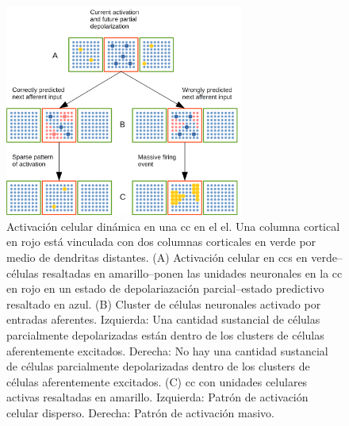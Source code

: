 \begin{figure}[h!]
    \centering
    \includegraphics[width=0.7\textwidth]{Activation.png}
    \caption{Activación celular dinámica en una \gls{cc} en el \gls{el}.
    Una columna cortical en rojo está vinculada con dos columnas corticales en verde por medio de dendritas distantes.
    (A) Activación celular en \glspl{cc} en verde--células resaltadas en amarillo--ponen las unidades neuronales
    en la \gls{cc} en rojo en un estado de depolariazación parcial--estado predictivo resaltado en azul.
    (B) Cluster de células neuronales activado por entradas aferentes.
    Izquierda: Una cantidad sustancial de células parcialmente depolarizadas están dentro de los clusters de células aferentemente excitados.
    Derecha: No hay una cantidad sustancial de células parcialmente depolarizadas dentro de los clusters de células aferentemente excitados.
    (C) \gls{cc} con unidades celulares activas resaltadas en amarillo.
    Izquierda: Patrón de activación celular disperso.
    Derecha: Patrón de activación masivo.}
    \label{fig:Activation}
\end{figure}

